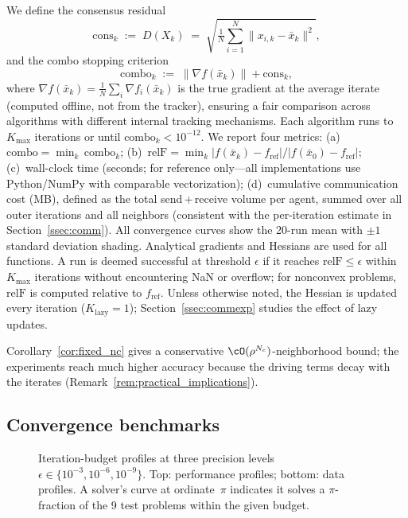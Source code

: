 \documentclass[review,onefignum,onetabnum]{siamart171218}
\begin{document}
	We define the consensus residual
	\[
	\mathrm{cons}_k
	\;:=\;
	D(X_k)
	\;=\;
	\sqrt{\tfrac{1}{N}\textstyle\sum_{i=1}^{N}\|x_{i,k}-\bar x_k\|^{2}},
	\]
	and the combo stopping criterion
	\[
	\mathrm{combo}_k
	\;:=\;
	\|\nabla f(\bar x_k)\| + \mathrm{cons}_k,
	\]
	where $\nabla f(\bar x_k)=\frac{1}{N}\sum_{i}\nabla f_i(\bar x_k)$
	is the true gradient at the average iterate (computed offline,
	not from the tracker), ensuring a fair comparison across algorithms
	with different internal tracking mechanisms.
	Each algorithm runs to $K_{\max}$ iterations or until
	$\mathrm{combo}_k < 10^{-12}$.
	We report four metrics:
	(a)~$\mathrm{combo}=\min_k\,\mathrm{combo}_k$;
	(b)~$\mathrm{relF}=\min_k |f(\bar x_k)-f_{\mathrm{ref}}|/|f(\bar x_0)-f_{\mathrm{ref}}|$;
	(c)~wall-clock time (seconds; for reference only---all implementations
	use Python/NumPy with comparable vectorization);
	(d)~cumulative communication cost (MB), defined as the total
	send\,+\,receive volume per agent, summed over all outer iterations and all
	neighbors (consistent with the per-iteration estimate in Section~\ref{ssec:comm}).
	All convergence curves show the 20-run mean with $\pm1$ standard
	deviation shading.
	Analytical gradients and Hessians are used for all functions.
	A run is deemed successful at threshold $\epsilon$ if it reaches
	$\mathrm{relF}\le\epsilon$ within $K_{\max}$ iterations without
	encountering NaN or overflow; for nonconvex problems, $\mathrm{relF}$ is
	computed relative to $f_{\mathrm{ref}}$.
	Unless otherwise noted, the Hessian is updated every iteration
	($K_{\mathrm{lazy}}{=}1$); Section~\ref{ssec:commexp} studies the
	effect of lazy updates.
	
	Corollary~\ref{cor:fixed_nc} gives a conservative
	$\cO(\rho^{N_c})$-neighborhood bound; the experiments reach
	much higher accuracy because the driving terms decay with the
	iterates (Remark~\ref{rem:practical_implications}).
	
	\FloatBarrier
	\subsection{Convergence benchmarks}\label{ssec:convergence}
	
	
	\begin{figure}[htbp]
		\centering
		\caption{Iteration-budget profiles at three precision levels
			$\epsilon\in\{10^{-3},10^{-6},10^{-9}\}$.
			Top: performance profiles; bottom: data profiles.
			A solver's curve at ordinate~$\pi$ indicates it solves a
			$\pi$-fraction of the 9 test problems within the given budget.}
		\label{fig:profiles}
	\end{figure}
	
\end{document}

